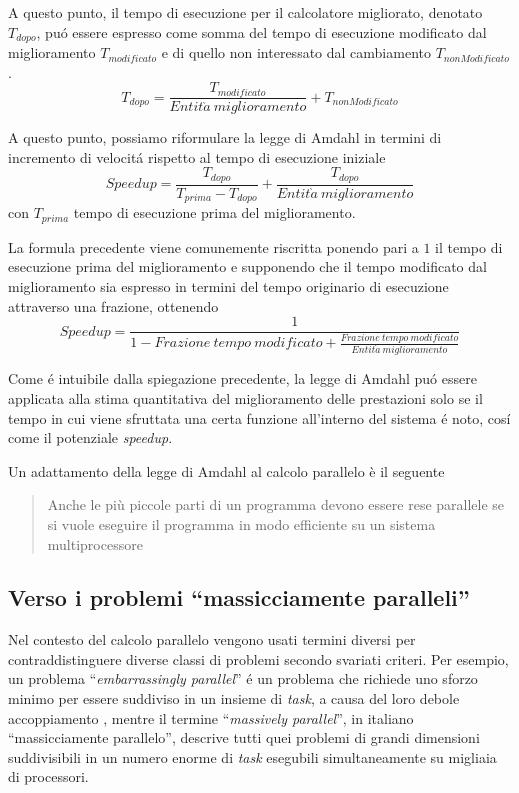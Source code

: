 A questo punto, il tempo di esecuzione per il calcolatore migliorato, denotato $T_{dopo}$, pu\'o essere espresso come somma
del tempo di esecuzione modificato dal miglioramento $T_{modificato}$ e di quello non interessato dal cambiamento
$T_{nonModificato}$.
\[
    T_{dopo}=\frac{T_{modificato}}{Entit\grave{a}~miglioramento} + T_{nonModificato}
\]

A questo punto, possiamo riformulare la legge di Amdahl in termini di incremento di velocit\'a rispetto al tempo di esecuzione iniziale
\[
    \mathit{Speedup}=\frac{T_{dopo}}{T_{prima}-T_{dopo}}+\frac{T_{dopo}}{Entit\grave{a}~miglioramento}
\]
con $T_{prima}$ tempo di esecuzione prima del miglioramento.

La formula precedente viene comunemente riscritta ponendo pari a $1$ il tempo di esecuzione prima del miglioramento e supponendo che
il tempo modificato dal miglioramento sia espresso in termini del tempo originario di esecuzione attraverso una frazione, ottenendo
\[
    \mathit{Speedup} = \frac{1}{1 - \mathit{Frazione~tempo~modificato} + \frac{\mathit{Frazione~tempo~modificato}}{\mathit{Entit\grave{a}~miglioramento}}}
\]

Come \'e intuibile dalla spiegazione precedente, la legge di Amdahl pu\'o essere applicata alla stima quantitativa del miglioramento delle
prestazioni solo se il tempo in cui viene sfruttata una certa funzione all'interno del sistema \'e noto, cos\'i come il
potenziale \textit{speedup}.

Un adattamento della legge di Amdahl al calcolo parallelo è il seguente

\blockquote{Anche le più piccole parti di un programma devono essere rese parallele se si vuole eseguire il programma in modo efficiente su un sistema multiprocessore}

\subsection{Verso i problemi \enquote{massicciamente paralleli}}
Nel contesto del calcolo parallelo vengono usati termini diversi per contraddistinguere diverse classi di problemi secondo svariati criteri.\newline
Per esempio, un problema \enquote{\textit{embarrassingly parallel}} \'e un problema che richiede uno sforzo minimo per essere suddiviso in un insieme di
\textit{task}, a causa del loro debole accoppiamento \cite{Herlihy2012}, mentre il termine \enquote{\textit{massively parallel}}, in italiano \enquote{massicciamente parallelo}, 
descrive tutti quei problemi di grandi dimensioni suddivisibili in un numero enorme di \textit{task} esegubili simultaneamente su migliaia di processori.

